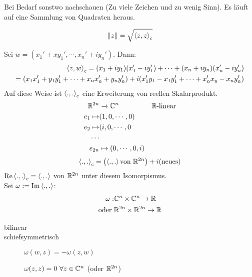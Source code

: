 \begin{Bew}
  Bei Bedarf sonstwo nachschauen (Zu viele Zeichen und zu wenig Sinn). Es läuft auf eine Sammlung von Quadraten heraus.
\end{Bew}
\begin{Def}
  \[\left\| z \right\|=\sqrt{\left\langle z,z \right\rangle_c}\]
\end{Def}
\begin{Bem}
  Sei $w=(x_1'+xy_1',\cdots,x_n'+iy_n')$. Dann:
  \begin{align*}
    \left\langle z,w \right\rangle_c=(x_1+iy_1)(x_1'-iy_1')+\cdots+(x_n+iy_n)(x_n'-iy_n')\\
    =(x_1x_1'+y_1y_1'+\cdots+x_nx_n'+y_ny_n')+i(x_1'y_1-x_1y_1'+\cdots+x_n'x_y-x_ny_n')
  \end{align*}
  Auf diese Weise ist $\left\langle .,. \right\rangle_c$ eine Erweiterung von reellen Skalarprodukt.
  \begin{align*}
    \mathbb{R}^{2n}&\xrightarrow{~}\mathbb{C}^n&\mathbb{R}\text{-linear}\\
    e_1\mapsto&(1,0,\cdots,0)\\
    e_2\mapsto&(i,0,\cdots,0\\
    \cdots\\
    e_{2n}&\mapsto(0,\cdots,0,i)
  \end{align*}
  \[\left\langle .,. \right\rangle_c=\left( \left\langle .,. \right\rangle \text{von}\ \mathbb{R}^{2n} \right) + i(\text{neues})\]
  $\operatorname{Re}\left\langle .,. \right\rangle_c=\left\langle .,. \right\rangle$ von $\mathbb{R}^{2n}$ unter diesem Isomorpismus.\\
  Sei $\omega:=\operatorname{Im}\left\langle .,. \right\rangle$:
  \begin{align*}
    \omega:&\mathbb{C}^n\times \mathbb{C}^n\to\mathbb{R}\\
    \text{oder}\ & \mathbb{R}^{2n}\times\mathbb{R}^{2n}\to\mathbb{R}
  \end{align*}
\end{Bem}
\begin{Eig}
  \begin{description}
    \item[bilinear]
    \item[schiefsymmetrisch] $\omega(w,z)=-\omega(z,w)$
    \item[] $\omega(z,z)=0\ \forall z\in\mathbb{C}^n$ (oder $\mathbb{R}^{2n}$)
  \end{description}
\end{Eig}
